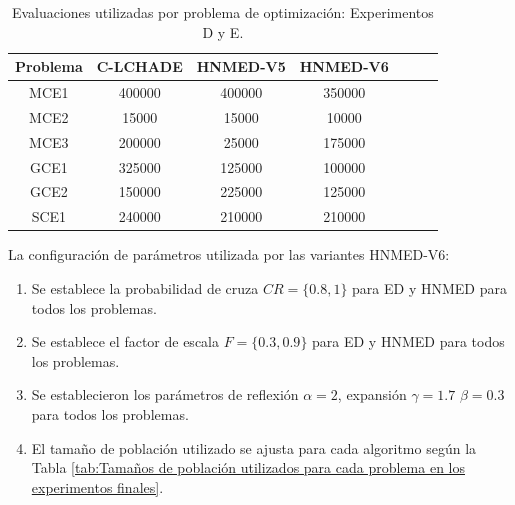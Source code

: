 \begin{table}[]
	
	\caption{Evaluaciones utilizadas por problema de optimización: Experimentos D y E.}
	\label{tab:Evaluaciones utilizadas por problema de optimización: Experimentos D y E.}
	\centering
	
	\begin{tabular}{ccccccc}
		\textbf{Problema} &   C-LCHADE     &HNMED-V5&HNMED-V6 \\
		\hline
		MCE1   &   400000 &400000 &350000   \\
		MCE2   &   15000  &15000  &10000   \\
		MCE3   &   200000 &25000  &175000  \\
		GCE1   &   325000 &125000  &100000\\
		GCE2   &   150000 &225000  &125000\\
		SCE1   &   240000 &210000  &210000\\
	\end{tabular}
	
\end{table}
La configuración de parámetros utilizada por las variantes HNMED-V6:
\begin{enumerate}
	\item Se establece la probabilidad de cruza $CR=\{0.8, 1\}$ para ED y HNMED para todos los problemas.
	\item Se establece el factor de escala $F=\{0.3, 0.9\}$ para ED y HNMED para todos los problemas.
	\item Se establecieron los parámetros de reflexión $\alpha=2$, expansión $\gamma=1.7$ $\beta=0.3$ para todos los problemas.
	\item El tamaño de población utilizado se ajusta para cada algoritmo según la Tabla \ref{tab:Tamaños de población utilizados para cada problema en los experimentos finales}. 
\end{enumerate}


